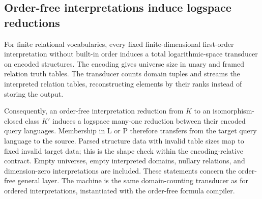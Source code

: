 \begin{result}
\subsection{Order-free interpretations induce logspace reductions}
For finite relational vocabularies, every fixed finite-dimensional
first-order interpretation without built-in order induces a total
logarithmic-space transducer on encoded structures. The encoding gives
universe size in unary and framed relation truth tables. The transducer
counts domain tuples and streams the interpreted relation tables,
reconstructing elements by their ranks instead of storing the output.

Consequently, an order-free interpretation reduction from $K$ to an
isomorphism-closed class $K'$ induces a logspace many-one reduction between
their encoded query languages. Membership in L or P therefore transfers
from the target query language to the source. Parsed structure data with invalid
table sizes map to fixed invalid target data; this is the shape check within
the encoding-relative contract. Empty universes, empty interpreted domains,
nullary relations, and dimension-zero interpretations are included.
These statements concern the order-free general layer. The machine is the
same domain-counting transducer as for ordered interpretations, instantiated
with the order-free formula compiler.
\citep{Immerman1999,Sipser2013}
\end{result}


